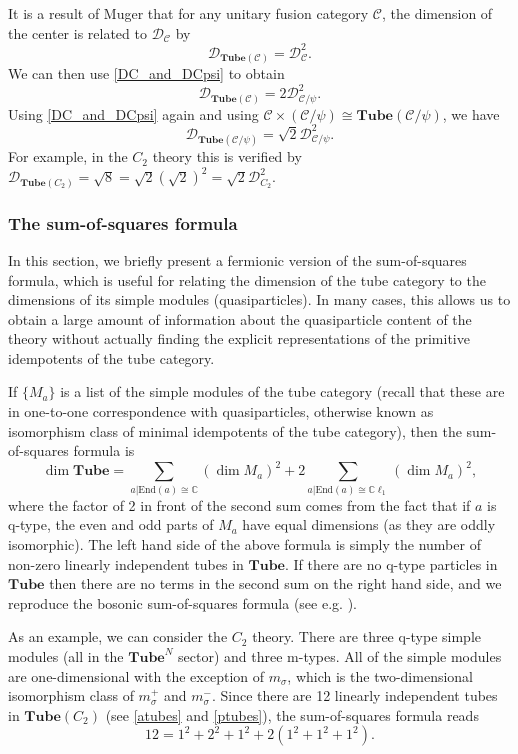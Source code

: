 \documentclass[12pt,a4paper]{article}
\newcommand{\cc}{\mathbb{C}}
\newcommand{\mcd}{\mathcal{D}}
\newcommand{\mcc}{\mathcal{C}}
\newcommand\be            {\begin{equation}}
\newcommand\ee            {\end{equation}}
\newcommand{\End}{\text{End}}
\newcommand{\cl}{\mathbb{C}\ell}
\newcommand{\tube}{\textbf{Tube}}
\begin{document}
It is a result of Muger \cite{muger2003a,2003b} that for any unitary fusion category $\mcc$, 
the dimension of the center is related to $\mcd_\mcc$ by 
\be \mcd_{\tube(\mcc)} =\mcd^2_\mcc.\ee
We can then use \eqref{DC_and_DCpsi} to obtain 
\be \mcd_{\tube(\mcc)} = 2\mcd^2_{\mcc/\psi}.\ee
Using \eqref{DC_and_DCpsi} again and using $\mcc \times (\mcc/\psi) \cong \tube(\mcc/\psi)$, we have 
\be \mcd_{\tube(\mcc/\psi)} = \sqrt{2}\mcd^2_{\mcc/\psi}.\ee
For example, in the $C_2$ theory this is verified by $\mcd_{\tube(C_2)} = \sqrt{8} = \sqrt{2} (\sqrt{2})^2 = \sqrt{2} \mcd^2_{C_2}.$



\subsubsection{The sum-of-squares formula}

In this section, we briefly present a fermionic version of the sum-of-squares formula, which is useful for relating the dimension
of the tube category to the dimensions of its simple modules (quasiparticles). 
In many cases, this allows us to obtain a large amount of information about the quasiparticle 
content of the theory without actually finding the explicit representations of the primitive 
idempotents of the tube category.

If $\{M_a\}$ is a list of the simple modules of the tube category 
(recall that these are in one-to-one correspondence with quasiparticles, otherwise known as isomorphism class of minimal idempotents of the tube category), then 
the sum-of-squares formula is
\be \label{sumofsqs} \dim \tube = \sum_{a | \End(a) \cong \cc} (\dim M_a)^2 + 2\sum_{a|\End(a) \cong \cl_1} (\dim M_a)^2,\ee
where the factor of 2 in front of the second sum comes from the fact that if $a$ is q-type, 
the even and odd parts of $M_a$ have equal dimensions (as they are oddly isomorphic). 
The left hand side of the above formula is simply the number of non-zero linearly independent tubes in $\tube$. 
If there are no q-type particles in $\tube$ then there are no terms in the second sum on the right hand side, 
and we reproduce the bosonic sum-of-squares formula (see e.g. \cite{Lan2014}). 

As an example, we can consider the $C_2$ theory. 
There are three q-type simple modules (all in the $\tube^N$ sector) and three m-types. 
All of the simple modules are one-dimensional with the exception of $m_\sigma$, 
which is the two-dimensional isomorphism class of $m_\sigma^+$ and $m_\sigma^-$. 
Since there are 12 linearly independent tubes in $\tube(C_2)$ (see \eqref{atubes} and \eqref{ptubes}), 
the sum-of-squares formula reads
\be 12 = 1^2+2^2+1^2+2(1^2+1^2+1^2).\ee
\end{document}
